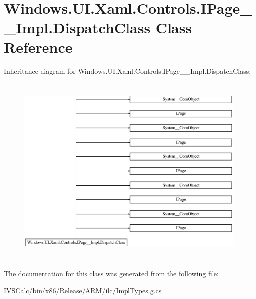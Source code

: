 \hypertarget{class_windows_1_1_u_i_1_1_xaml_1_1_controls_1_1_i_page_____impl_1_1_dispatch_class}{}\section{Windows.\+U\+I.\+Xaml.\+Controls.\+I\+Page\+\_\+\+\_\+\+Impl.\+Dispatch\+Class Class Reference}
\label{class_windows_1_1_u_i_1_1_xaml_1_1_controls_1_1_i_page_____impl_1_1_dispatch_class}
Inheritance diagram for Windows.\+U\+I.\+Xaml.\+Controls.\+I\+Page\+\_\+\+\_\+\+Impl.\+Dispatch\+Class\+:\begin{figure}[H]
\begin{center}
\leavevmode
\includegraphics[height=9.506172cm]{class_windows_1_1_u_i_1_1_xaml_1_1_controls_1_1_i_page_____impl_1_1_dispatch_class}
\end{center}
\end{figure}


The documentation for this class was generated from the following file\+:\begin{DoxyCompactItemize}
\item 
I\+V\+S\+Calc/bin/x86/\+Release/\+A\+R\+M/ilc/Impl\+Types.\+g.\+cs\end{DoxyCompactItemize}
